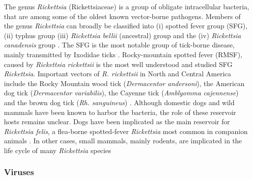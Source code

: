 \documentclass[a4paper, nobind]{templates/ociamthesis}
\begin{document}
The genus \emph{Rickettsia} (Rickettsiaceae) is a group of obligate intracellular bacteria, that are among some of the oldest known vector-borne pathogens.
Members of the genus \emph{Rickettsia} can broadly be classified into (i) spotted fever group (SFG), (ii) typhus group (iii) \emph{Rickettsia bellii} (ancestral) group and the (iv) \emph{Rickettsia canadensis} group \autocite{merhjRickettsialEvolutionLight2010}.
The SFG is the most notable group of tick-borne disease, mainly transmitted by Ixodidae ticks \autocite{parolaUpdateTickBorneRickettsioses2013}.
Rocky-mountain spotted fever (RMSF), caused by \emph{Rickettsia rickettsii} is the most well understood and studied SFG \emph{Rickettsia}.
Important vectors of \emph{R. rickettsii} in North and Central America include the Rocky Mountain wood tick (\emph{Dermacentor andersoni}), the American dog tick (\emph{Dermacentor variabilis}), the Cayenne tick (\emph{Amblyomma cajennense}) and the brown dog tick (\emph{Rh. sanguineus}) \autocite{dantas-torresRockyMountainSpotted2007,lopez-perezDiversityRickettsiaeDomestic2021}.
Although domestic dogs and wild mammals have been known to harbor the bacteria, the role of these reservoir hosts remains unclear.
Dogs have been implicated as the main reservoir for \emph{Rickettsia felis}, a flea-borne spotted-fever \emph{Rickettsia} most common in companion animals \autocite{ng-nguyenDomesticDogsAre2020}.
In other cases, small mammals, mainly rodents, are implicated in the life cycle of many \emph{Rickettsia} species \autocite{tomassoneNeglectedAspectsTickborne2018,parisBriefHistoryMajor2020}

\hypertarget{viruses}{%
\subsubsection{Viruses}\label{viruses}}
\end{document}
